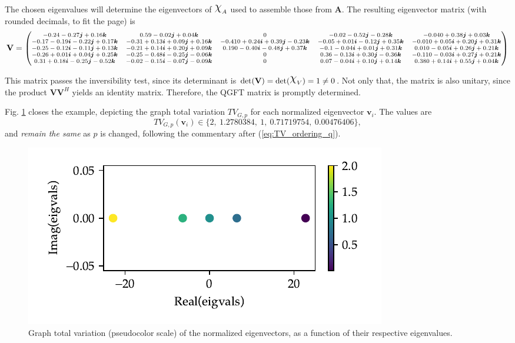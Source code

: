 \begin{landscape}
The chosen eigenvalues will determine the eigenvectors of $\rchi_A$ used to assemble those from $\mathbf{A}$. The resulting eigenvector matrix (with rounded decimals, to fit the page) is
\begin{equation*}
\scriptsize
\mathbf{V} = \left(\begin{matrix}
-0.24  -0.27\boldsymbol{j} +0.16\boldsymbol{k} & 0.59  -0.02\boldsymbol{j} +0.04\boldsymbol{k} & 0  & -0.02  -0.52\boldsymbol{j} -0.28\boldsymbol{k} & -0.040  +0.38\boldsymbol{j} +0.03\boldsymbol{k} \\
-0.17 -0.19\boldsymbol{i} -0.22\boldsymbol{j} +0.17\boldsymbol{k} & -0.31 +0.13\boldsymbol{i} +0.09\boldsymbol{j} +0.16\boldsymbol{k} & -0.410 +0.24\boldsymbol{i} +0.39\boldsymbol{j} -0.23\boldsymbol{k}  & -0.05 +0.01\boldsymbol{i} -0.12\boldsymbol{j} +0.35\boldsymbol{k} & -0.010 +0.05\boldsymbol{i} +0.20\boldsymbol{j} +0.31\boldsymbol{k} \\
-0.25 -0.12\boldsymbol{i} -0.11\boldsymbol{j} +0.13\boldsymbol{k} & -0.21 +0.14\boldsymbol{i} +0.20\boldsymbol{j} +0.09\boldsymbol{k} & 0.190 -0.40\boldsymbol{i} -0.48\boldsymbol{j} +0.37\boldsymbol{k}  & -0.1 -0.04\boldsymbol{i} +0.01\boldsymbol{j} +0.31\boldsymbol{k} & 0.010 -0.05\boldsymbol{i} +0.26\boldsymbol{j} +0.21\boldsymbol{k} \\
-0.26 +0.01\boldsymbol{i} +0.04\boldsymbol{j} +0.25\boldsymbol{k} & -0.25 -0.48\boldsymbol{i} -0.25\boldsymbol{j} -0.06\boldsymbol{k} & 0  & 0.36 -0.13\boldsymbol{i} +0.30\boldsymbol{j} -0.36\boldsymbol{k} & -0.110 -0.03\boldsymbol{i} +0.27\boldsymbol{j} +0.21\boldsymbol{k} \\
0.31 +0.18\boldsymbol{i} -0.25\boldsymbol{j} -0.52\boldsymbol{k} & -0.02 -0.15\boldsymbol{i} -0.07\boldsymbol{j} -0.09\boldsymbol{k} & 0  & 0.07 -0.04\boldsymbol{i} +0.10\boldsymbol{j} +0.14\boldsymbol{k} & 0.380 +0.14\boldsymbol{i} +0.55\boldsymbol{j} +0.04\boldsymbol{k} \\
\end{matrix}\right)
\end{equation*}

This matrix passes the inversibility test, since its determinant is $\mathrm{det}(\mathbf{V}) = \mathrm{det}(\rchi_V) = 1 \neq 0$. Not only that, the matrix is also unitary, since the product $\mathbf{V} \mathbf{V}^H$ yields an identity matrix. Therefore, the QGFT matrix is promptly determined.

Fig. \ref{fig:simple_example_tv} closes the example, depicting the graph total variation $TV_{G, p}$ for each normalized eigenvector $\mathbf{v}_i$. The values are
\begin{equation}
TV_{G, p}(\mathbf{v}_i) \in 
\{2, \ 1.2780384,  \ 1,  \ 0.71719754,  \ 0.00476406\},
\end{equation}
and \textit{remain the same} as $p$ is changed, following the commentary after (\ref{eq:TV_ordering_q}).
\end{landscape}

\begin{figure}
\centering
\includegraphics[width=0.55\linewidth]{thesis/Figures/simple_example_tv.pdf}
\caption{Graph total variation (pseudocolor scale) of the normalized eigenvectors, as a function of their respective eigenvalues.}
\label{fig:simple_example_tv}
\end{figure}


